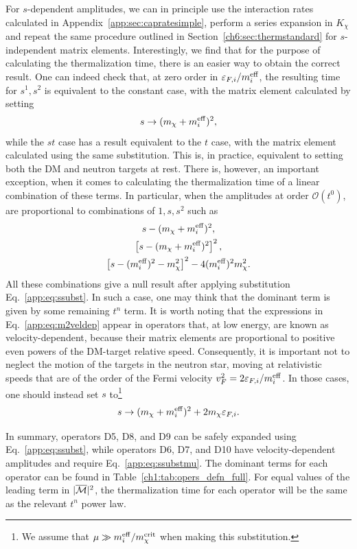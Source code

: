  For $s$-dependent amplitudes, we can in principle use the interaction rates calculated in Appendix~\ref{app:sec:capratesimple}, perform a series expansion in $K_\chi$  and repeat the same procedure outlined in Section~\ref{ch6:sec:thermstandard} for $s$-independent matrix elements. Interestingly, we find that for the purpose of calculating the thermalization time, there is an easier way to obtain the correct result. One can indeed check that, at zero order in $\varepsilon_{F,i}/m_i^{\rm eff}$, the resulting time for $s^1, s^2$ is equivalent to the constant case, with the matrix element calculated by setting 
\begin{equation}
    s\rightarrow (m_\chi+m_i^{\rm eff})^2,
    \label{app:eq:ssubst}
\end{equation}
while the $s t $ case has a result equivalent to the $t$ case, with the matrix element calculated using the same substitution. This is, in practice, equivalent to setting both the DM and neutron targets at rest. There is, however, an important exception, when it comes to calculating the thermalization time of a linear combination of these terms. In particular, when the amplitudes at order $\mathcal{O}(t^0)$, are proportional to combinations of $1,s,s^2$ such as
\begin{gather}
s-(m_\chi+m_i^{\rm eff})^2,\nonumber\\
\left[s-(m_\chi+m_i^{\rm eff})^2\right]^2,\nonumber\\
\left[s-(m_i^{\rm eff})^2-m_\chi^2\right]^2-4(m_i^{\rm eff})^2 m_\chi^2.\label{app:eq:m2veldep}
\end{gather}
All these combinations give a null result after applying substitution Eq.~\ref{app:eq:ssubst}. In such a case, one may think that the dominant term is given by some remaining $t^n$ term. It is worth noting that the expressions in  Eq.~\ref{app:eq:m2veldep}  appear in operators that, at low energy, are known as velocity-dependent, because their matrix elements are proportional to positive even powers of the DM-target relative speed. Consequently, it is important not to neglect the motion of the targets in the neutron star, moving at relativistic speeds that are of the order of the Fermi velocity $v_F^2=2\varepsilon_{F,i}/m_i^{\rm eff}$. In those cases, one should instead set $s$ to\footnote{We assume that $\mu\gg m_i^{\rm eff}/m_\chi^{\rm crit}$ when making this substitution.}
\begin{equation}
    s\rightarrow (m_\chi+m_i^{\rm eff})^2+2m_\chi\varepsilon_{F,i}.
    \label{app:eq:ssubstmu}
\end{equation}


In summary, operators D5, D8, and D9 can be safely expanded using Eq.~\ref{app:eq:ssubst}, while operators D6, D7, and D10 have velocity-dependent amplitudes and require Eq.~\ref{app:eq:ssubstmu}. 
The dominant terms for each operator can be found in Table~\ref{ch1:tab:opers_defn_full}. 
For equal values of the leading term in $|\overline{\mathcal M}|^2$, the thermalization time for each operator will be the same as the relevant $t^n$ power law. 


